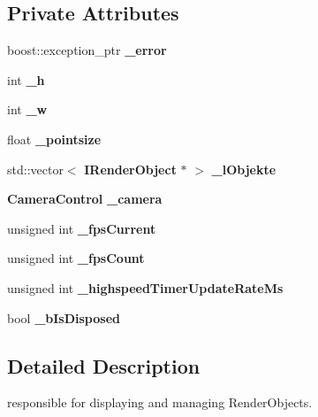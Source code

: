\subsection*{Private Attributes}
\begin{DoxyCompactItemize}
\item 
boost\-::exception\-\_\-ptr {\bfseries \-\_\-error}\label{classsfs__visualizer_1_1RenderEngine_ab5d0db5b3e5a6ae7f4a86c572e34600c}

\item 
int {\bfseries \-\_\-h}\label{classsfs__visualizer_1_1RenderEngine_a125284f755dac513f03de2815f9b6efe}

\item 
int {\bfseries \-\_\-w}\label{classsfs__visualizer_1_1RenderEngine_a757f565a1e8fe23cde41da1040f65a47}

\item 
float {\bfseries \-\_\-pointsize}\label{classsfs__visualizer_1_1RenderEngine_a8b2f772a985c77434922ec92f1a88dbe}

\item 
std\-::vector$<$ {\bf I\-Render\-Object} $\ast$ $>$ {\bfseries \-\_\-l\-Objekte}\label{classsfs__visualizer_1_1RenderEngine_aea1c5532fff65d98e86905bf5d810710}

\item 
{\bf Camera\-Control} {\bfseries \-\_\-camera}\label{classsfs__visualizer_1_1RenderEngine_aa6827702371b2b20b13adeb3dd3099fd}

\item 
unsigned int {\bfseries \-\_\-fps\-Current}\label{classsfs__visualizer_1_1RenderEngine_a20d49741071af2558526c9f81ae7349f}

\item 
unsigned int {\bfseries \-\_\-fps\-Count}\label{classsfs__visualizer_1_1RenderEngine_ade82bb4301cfd607386ce6c895724683}

\item 
unsigned int {\bfseries \-\_\-highspeed\-Timer\-Update\-Rate\-Ms}\label{classsfs__visualizer_1_1RenderEngine_ace032ad32dfb12a89f8aecb3ad0effa8}

\item 
bool {\bfseries \-\_\-b\-Is\-Disposed}\label{classsfs__visualizer_1_1RenderEngine_a61ad3dbc71432f261630d639debc061b}

\end{DoxyCompactItemize}


\subsection{Detailed Description}
responsible for displaying and managing Render\-Objects. 

